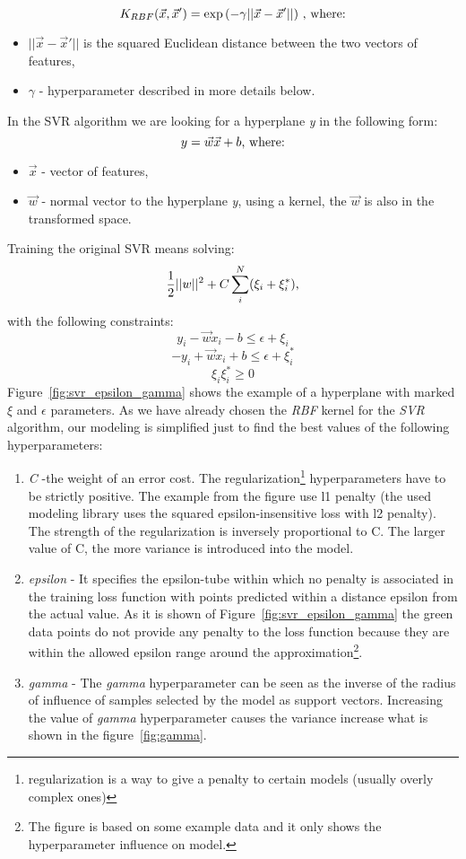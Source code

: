 \[ K_{RBF}(\vec{x}, \vec{x}') = \exp{(-\gamma||\vec{x} - \vec{x}'||)}\ \textnormal{, where:}\]
\begin{itemize}
	\item $ ||\vec{x} - \vec{x}'|| $ is the squared Euclidean distance between the two vectors of features,\newline
	\item $ \gamma $ - hyperparameter described in more details below.
\end{itemize}
In the SVR algorithm we are looking for a hyperplane \textit{y} in the following form:
\[ y = \vec{w} \vec{x} + b \textnormal{, where:}\]
\begin{itemize}
	\item $ \vec{x} $ - vector of features,
	\item $ \vec{w} $ - normal vector to the hyperplane \textit{y}, using a kernel, the $ \vec{w} $ is also in the transformed space.
\end{itemize}
Training the original SVR means solving:
\[ \frac{1}{2}||w||^2  + C \sum_{i}^{N}(\xi_i+\xi_i^*) \textnormal{,}\]
with the following constraints:
\[ y_i - \vec{w}x_i - b \le \epsilon + \xi_i  \]
\[ -y_i + \vec{w}x_i + b \le \epsilon + \xi_i^*  \]
\[ \xi_i \xi_i^* \ge 0 \]
Figure~\ref{fig:svr_epsilon_gamma} shows the example of a hyperplane with marked \textit{$\xi$} and \textit{$\epsilon$} parameters.
As we have already chosen the \textit{RBF} kernel for the \textit{SVR} algorithm, our modeling is simplified just to find the best values of the following hyperparameters\cite{svr}:
\begin{enumerate}
	\item \textit{C} -the weight of an error cost. The regularization\footnote{regularization is a way to give a penalty to certain models (usually overly complex ones)} hyperparameters have to be strictly positive. The example from the figure use l1 penalty (the used modeling library uses the squared epsilon-insensitive loss with l2 penalty). The strength of the regularization is inversely proportional to C. The larger value of C, the more variance is introduced into the model. 
	\item \textit{epsilon} - It specifies the epsilon-tube within which no penalty is associated in the training loss function with points predicted within a distance epsilon from the actual value. As it is shown of Figure~\ref{fig:svr_epsilon_gamma} the green data points do not provide any penalty to the loss function because they are within the allowed epsilon range around the approximation\footnote{\label{figure_example}The figure is based on some example data and it only shows the hyperparameter influence on model.}.
	\item \textit{gamma} - The \textit{gamma} hyperparameter can be seen as the inverse of the radius of influence of samples selected by the model as support vectors. Increasing the value of \textit{gamma} hyperparameter causes the variance increase what is shown in the figure~\ref{fig:gamma}.
	
\end{enumerate}
